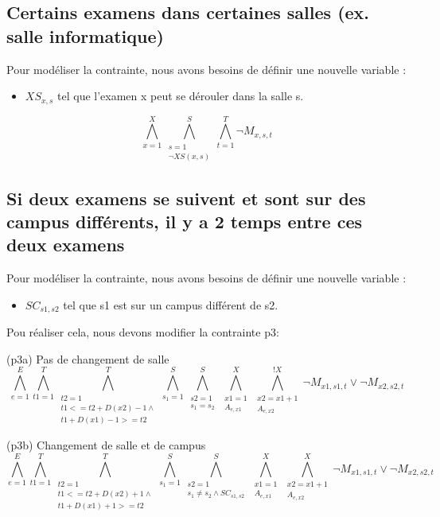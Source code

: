 \documentclass[a4paper,11pt]{article}
\begin{document}
\subsection{Certains examens dans certaines salles (ex. salle informatique)}
Pour modéliser la contrainte, nous avons besoins de définir une nouvelle variable :  
\begin{itemize}
	\item \( XS_{x,s}\) tel que l'examen x peut se dérouler dans la salle s.
\end{itemize}
\begin{displaymath}
	\bigwedge\limits_{x=1}^{X}\bigwedge\limits_{\substack{s=1 \\ \neg XS(x,s)}}^{S}\bigwedge\limits_{t=1}^{T} \neg M_{x, s, t} 
\end{displaymath}


\subsection{Si deux examens se suivent et sont sur des campus différents, il y a 2 temps entre ces deux examens}
Pour modéliser la contrainte, nous avons besoins de définir une nouvelle variable :  
\begin{itemize}
	\item \( SC_{s1,s2}\) tel que s1 est sur un campus différent de s2.
\end{itemize}
Pou réaliser cela, nous devons modifier la contrainte p3: 

(p3a) Pas de changement de salle
\begin{displaymath}
\bigwedge\limits_{e=1}^{E}\bigwedge\limits_{t1=1}^{T}\bigwedge\limits_{\substack{t2=1 \\ t1 <= t2 + D(x2)-1 \wedge \\ t1 + D(x1)-1 >= t2}}^{T}\bigwedge\limits_{s_{1}=1}^{S}\bigwedge\limits_{\substack{s2=1 \\ s_{1} = s_{2}}}^{S}\bigwedge\limits_{\substack{x1=1 \\ A_{e,x1}}}^{X}\bigwedge\limits_{\substack{x2=x1+1 \\ A_{e,x2}}}^{!X} \neg M_{x1, s1, t} \vee \neg M_{x2, s2, t}
\end{displaymath}

(p3b) Changement de salle et de campus
\begin{displaymath}
\bigwedge\limits_{e=1}^{E}\bigwedge\limits_{t1=1}^{T}\bigwedge\limits_{\substack{t2=1 \\ t1 <= t2 + D(x2) +1 \wedge \\ t1 + D(x1) +1 >= t2}}^{T}\bigwedge\limits_{s_{1}=1}^{S}\bigwedge\limits_{\substack{s2=1 \\ s_{1} \neq s_{2} \wedge SC_{s1,s2}}}^{S}\bigwedge\limits_{\substack{x1=1 \\ A_{e,x1}}}^{X}\bigwedge\limits_{\substack{x2=x1+1 \\ A_{e,x2}}}^{X} \neg M_{x1, s1, t} \vee \neg M_{x2, s2, t}
\end{displaymath}
\end{document}
